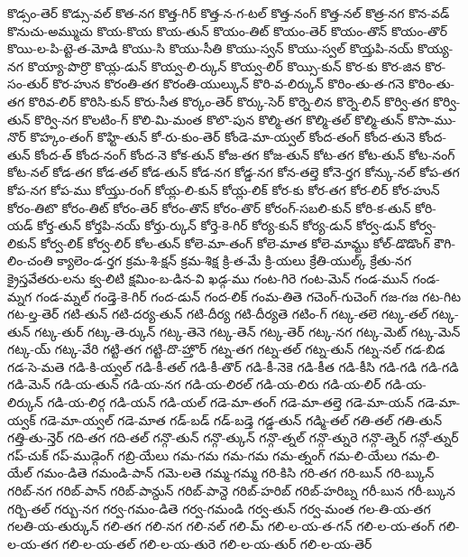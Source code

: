 {కొడ్సం-తెర్
కొడ్సు-వల్
కొత-నగ
కొత్త-గిర్
కొత్త-న-గ-టల్
కొత్త-నంగ్
కొత్త-నల్
కొత్ర-నగ
కొన-వడ్
కొనుచు-అమ్ముచు
కొయ-కొయ
కొయ-తున్
కొయం-తిట్
కొయం-తెర్
కొయం-తొన్
కొయం-తొర్
కొయి-ల-పి-ట్టె-త-మోడి
కొయు-సి
కొయు-సీతి
కొయు-స్వన్
కొయు-స్వల్
కొయ్తపి-నయ్
కొయ్య-నగ
కొయ్యా-పొర్రొ
కొయ్ల-డున్
కొయ్వ-లి-ర్కున్
కొయ్వ-లిర్
కొయ్సి-కున్
కొర-కు
కొర-జిన
కొర-సం-తుర్
కొర-హున
కొరంతి-తగ
కొరంతి-యుల్కున్
కొరి-వ-లిర్కున్
కొరిం-తు-త-గనె
కొరిం-తు-తగ
కొరివ-లిర్
కొరిసి-కున్
కొరు-సీత
కొర్కం-తెర్
కొర్కు-సెర్
కొర్నె-లిన
కొర్నె-లిన్
కొర్వి-తగ
కొర్వి-తున్
కొర్వి-నగ
కొలటిం-గ్
కొలి-మి-మంత
కొలొ-పున
కొల్మి-తగ
కొల్మి-తల్
కొల్మి-తున్
కొసా-ము-నొర్
కొహ్కం-తంగ్
కొహ్టి-తున్
కో-రు-కుం-తెర్
కోండె-మా-య్వల్
కోంద-తంగ్
కోంద-తునె
కోంద-తున్
కోంద-త్
కోంద-నంగ్
కోంద-నె
కోక-తున్
కోజ-తగ
కోజ-తున్
కోట-తగ
కోట-తున్
కోట-నంగ్
కోట-నల్
కోడ-తగ
కోడ-తల్
కోడ-తున్
కోడ-నగ
కోడ్డ-నగ
కోన-తల్తె
కోనె-ర్తగ
కోన్కు-నల్
కోప-తగ
కోప-నగ
కోప-ము
కోయ్తు-రంగ్
కోయ్ల-లి-కున్
కోయ్ల-లిక్
కోర-కు
కోర-తగ
కోర-లిర్
కోర-హున్
కోరం-తిటొ
కోరం-తిట్
కోరం-తెర్
కోరం-తొన్
కోరం-తొర్
కోరంగ్-సబలి-కున్
కోరి-క-తున్
కోరి-యడ్
కోర్త-తున్
కోర్తపి-నయ్
కోర్తు-ర్కున్
కోర్తె-కె-గిర్
కోర్య-కున్
కోర్య-డున్
కోర్వ-డున్
కోర్వ-లికున్
కోర్వ-లిక్
కోర్వ-లిర్
కోల-తున్
కోలె-మా-తంగ్
కోలె-మాత
కోలె-మామ్టు
కోల్-డొడొంగ్
కౌగి-లిం-చంతి
క్యాలెం-డ-ర్తగ
క్రమ-శి-క్షన్
క్రమ-శిక్ష
క్రి-త-మే
క్రి-యలు
క్రేతి-యుల్క్
క్రేతు-నగ
క్రైస్తవేతరు-లను
క్వ-లిటి
క్షమిం-బ-డిన-వి
ఖడ్గ-ము
గంట-గిరె
గంట-మెన్
గండ-మున్
గండ-మ్నగ
గండ-మ్నల్
గండ్తె-కె-గిర్
గంద-డున్
గంద-లిక్
గంమ-తితె
గచెంగ్-గుచెంగ్
గజ-గజ
గట-గిట
గట-ల్త-తెర్
గటి-తున్
గటి-దర్య-తున్
గటి-దీర్య
గటి-దీర్యతె
గటిం-గ్
గట్క-తలె
గట్క-తల్
గట్క-తున్
గట్క-తుర్
గట్క-తె-ర్కున్
గట్క-తెనె
గట్క-తెన్
గట్క-తెర్
గట్క-నగ
గట్క-మెట్
గట్క-మెన్
గట్క-య్
గట్క-వేరి
గట్టి-తగ
గట్టి-దొ-హ్తొర్
గట్న-తగ
గట్న-తల్
గట్న-తున్
గట్న-నల్
గడ-బిడ
గడ-సె-మతె
గడి-కి-య్వల్
గడి-కీ-తల్
గడి-కీ-తొర్
గడి-కీ-నెకె
గడి-కీత
గడి-కీసి
గడి-గడి
గడి-గడి
గడి-మెన్
గడి-య-తున్
గడి-య-నగ
గడి-య-లిరల్
గడి-య-లిరు
గడి-య-లిర్
గడి-య-లిర్కున్
గడి-య-లిర్గ
గడి-యన్
గడి-యల్
గడె-మా-తంగ్
గడె-మా-తల్తె
గడె-మా-యన్
గడె-మా-య్వక్
గడె-మా-య్వల్
గడె-మాత
గడ్-బడ్
గడ్-బడ్తె
గడ్డ-తున్
గడ్మి-తల్
గతి-తల్
గతి-తున్
గత్తి-తు-న్తెర్
గది-తగ
గది-తల్
గన్గొ-తున్
గన్గొ-త్కున్
గన్గొ-త్నల్
గన్గొ-త్నురె
గన్గొ-త్నెర్
గన్గో-త్నుర్
గప్-చుక్
గప్-ముడ్గెంగ్
గబ్రి-యేలు
గమ-గమ
గమ-గమ
గమ-త్నంగ్
గమ-లి-యేలు
గమ-లి-యేల్
గమం-డితె
గమండి-పాన్
గమె-లతె
గమ్మ-గమ్మ
గరి-కిసి
గరి-తగ
గరి-బున్
గరి-బ్కున్
గరిబ్-నగ
గరిబ్-పాన్
గరిబ్-పాన్దున్
గరిబ్-పాన్దె
గరిబ్-హరిబ్
గరిబ్-హరిబ్న
గరీ-బున
గరీ-బ్కున
గర్బి-తల్
గర్బు-నగ
గర్వ-గమం-డితె
గర్వ-గమండి
గర్వ-తున్
గర్వ-మంత
గల-తి-య-తగ
గలతి-య-తుర్కున్
గలి-తగ
గలి-నగ
గలి-నల్
గలి-మ్
గలి-ల-య-త-గన్
గలి-ల-య-తంగ్
గలి-ల-య-తగ
గలి-ల-య-తల్
గలి-ల-య-తురె
గలి-ల-య-తుర్
గలి-ల-య-తెర్
}
